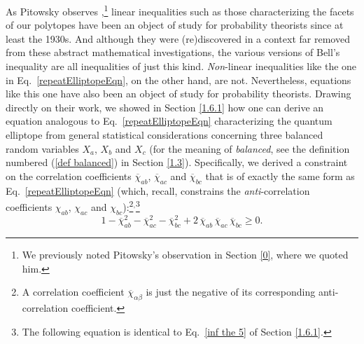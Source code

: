 As Pitowsky observes \citeyearpar[p. IV]{Pitowsky 1989b},\footnote{We previously noted Pitowsky's observation in Section \ref{0}, where we quoted him.} linear inequalities such as those characterizing the facets of our polytopes have been an object of study for probability theorists since at least the 1930s. And although they were (re)discovered in a context far removed from these abstract mathematical investigations, the various versions of Bell's inequality are all inequalities of just this kind. \emph{Non}-linear inequalities like the one in Eq.\ \eqref{repeatElliptopeEqn}, on the other hand, are not. Nevertheless, equations like this one have also been an object of study for probability theorists. Drawing directly on their work, we showed in Section \ref{1.6.1} how one can derive an equation analogous to Eq.\ \eqref{repeatElliptopeEqn} characterizing the quantum elliptope from general statistical considerations concerning three balanced random variables $X_a$, $X_b$ and $X_c$ (for the meaning of \emph{balanced}, see the definition numbered (\ref{def balanced}) in Section \ref{1.3}). Specifically, we derived a constraint on the correlation coefficients $\overline{\chi}_{ab}$, $\overline{\chi}_{ac}$ and $\overline{\chi}_{bc}$ that is of exactly the same form as Eq.\ \eqref{repeatElliptopeEqn} (which, recall, constrains the \emph{anti}-correlation coefficients $\chi_{ab}$, $\chi_{ac}$ and $\chi_{bc}$):\footnote{A correlation coefficient $\overline{\chi}_{\alpha\beta}$ is just the negative of its corresponding anti-correlation coefficient.}$^,$\footnote{The following equation is identical to Eq.\ \eqref{inf the 5} of Section \ref{1.6.1}.}
\begin{equation}
1 - \overline{\chi}_{ab}^2 - \overline{\chi}_{ac}^2 - \overline{\chi}_{bc}^2 + 2 \, \overline{\chi}_{ab} \, \overline{\chi}_{ac} \, \overline{\chi}_{bc} \ge 0.
\label{repeat inf the 5}
\end{equation}

